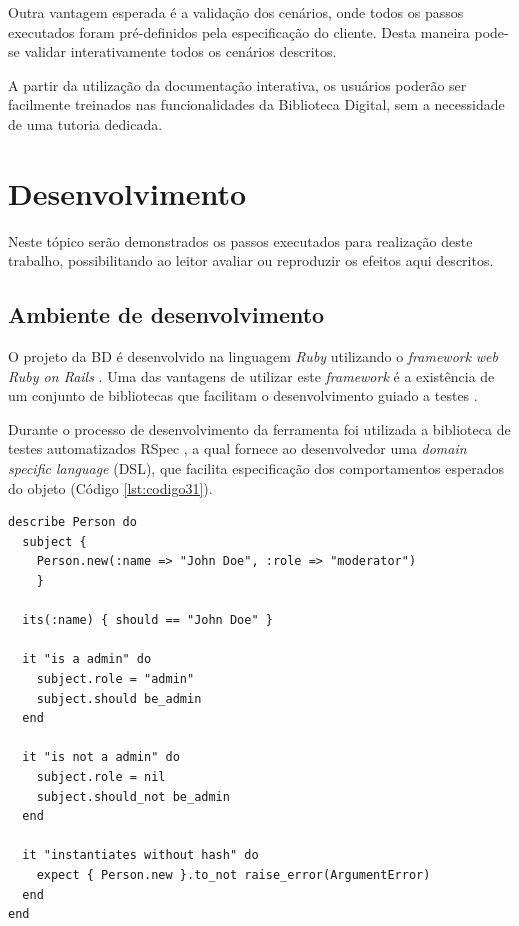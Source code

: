 Outra vantagem esperada é a validação dos cenários, onde todos os passos executados foram pré-definidos pela especificação do cliente. Desta maneira pode-se validar interativamente todos os cenários descritos.

A partir da utilização da documentação interativa, os usuários poderão ser facilmente treinados nas funcionalidades da Biblioteca Digital, sem a necessidade de uma tutoria dedicada.

\section{Desenvolvimento}

Neste tópico serão demonstrados os passos executados para realização deste trabalho, possibilitando ao leitor avaliar ou reproduzir os efeitos aqui descritos.

\subsection{Ambiente de desenvolvimento}

O projeto da BD é desenvolvido na linguagem \textit{Ruby} utilizando o \textit{framework} \textit{web Ruby on Rails} \cite{RAILS}. Uma das vantagens de utilizar este \textit{framework} é a existência de um conjunto de bibliotecas que facilitam o desenvolvimento guiado a testes \cite{BECK}.

Durante o processo de desenvolvimento da ferramenta foi utilizada a biblioteca de testes automatizados RSpec \cite{CHELIMSKY}, a qual fornece ao desenvolvedor uma \textit{domain specific language} (DSL), que facilita especificação dos comportamentos esperados do objeto (Código \ref{lst:codigo31}).

{\singlespace
\begin{lstlisting}[caption=Exemplo da DSL do Rspec,label={lst:codigo31}]
describe Person do
  subject {
    Person.new(:name => "John Doe", :role => "moderator")
    }

  its(:name) { should == "John Doe" }

  it "is a admin" do
    subject.role = "admin"
    subject.should be_admin
  end

  it "is not a admin" do
    subject.role = nil
    subject.should_not be_admin
  end

  it "instantiates without hash" do
    expect { Person.new }.to_not raise_error(ArgumentError)
  end
end
\end{lstlisting}
}

